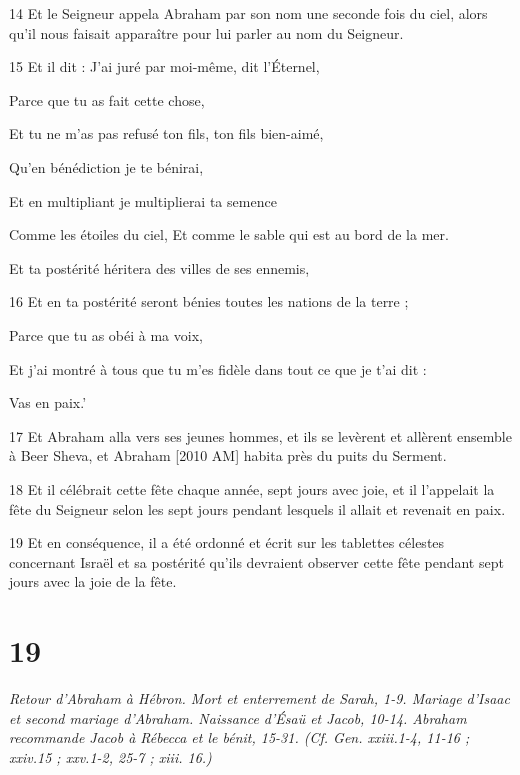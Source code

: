 \par 14 Et le Seigneur appela Abraham par son nom une seconde fois du ciel, alors qu'il nous faisait apparaître pour lui parler au nom du Seigneur.
\par 15 Et il dit : J'ai juré par moi-même, dit l'Éternel,
\par    
\par     Parce que tu as fait cette chose,  
\par     Et tu ne m'as pas refusé ton fils, ton fils bien-aimé,  
\par     Qu'en bénédiction je te bénirai,
\par    
\par     Et en multipliant je multiplierai ta semence  
\par     Comme les étoiles du ciel, Et comme le sable qui est au bord de la mer.
\par    
\par     Et ta postérité héritera des villes de ses ennemis,  
\par    
\par 16 Et en ta postérité seront bénies toutes les nations de la terre ;
\par    
\par     Parce que tu as obéi à ma voix,  
\par     Et j’ai montré à tous que tu m’es fidèle dans tout ce que je t’ai dit :
\par    
\par     Vas en paix.'
\par    
\par 17 Et Abraham alla vers ses jeunes hommes, et ils se levèrent et allèrent ensemble à Beer Sheva, et Abraham [2010 AM] habita près du puits du Serment.
\par 18 Et il célébrait cette fête chaque année, sept jours avec joie, et il l'appelait la fête du Seigneur selon les sept jours pendant lesquels il allait et revenait en paix.
\par 19 Et en conséquence, il a été ordonné et écrit sur les tablettes célestes concernant Israël et sa postérité qu'ils devraient observer cette fête pendant sept jours avec la joie de la fête.

\chapter{19}

\par \textit{Retour d'Abraham à Hébron. Mort et enterrement de Sarah, 1-9. Mariage d'Isaac et second mariage d'Abraham. Naissance d'Ésaü et Jacob, 10-14. Abraham recommande Jacob à Rébecca et le bénit, 15-31. (Cf. Gen. xxiii.1-4, 11-16 ; xxiv.15 ; xxv.1-2, 25-7 ; xiii. 16.)}

